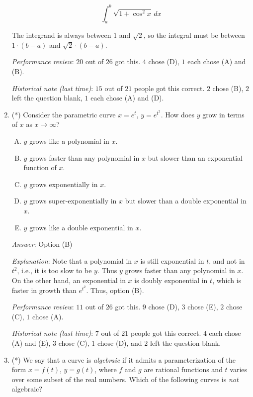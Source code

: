 \documentclass[10pt]{amsart}
\begin{document}
\begin{enumerate}
  $$\int_a^b \sqrt{1 + \cos^2x} \, dx$$

  The integrand is always between $1$ and $\sqrt{2}$, so the integral
  must be between $1 \cdot (b - a)$ and $\sqrt{2} \cdot (b - a)$.

  {\em Performance review}: $20$ out of $26$ got this. $4$ chose (D),
  $1$ each chose (A) and (B).

  {\em Historical note (last time)}: $15$ out of $21$ people got this
  correct. $2$ chose (B), $2$ left the question blank, $1$ each chose
  (A) and (D).

\item (*) Consider the parametric curve $x = e^t$, $y = e^{t^2}$. How does
  $y$ grow in terms of $x$ as $x \to \infty$?

  \begin{enumerate}[(A)]
  \item $y$ grows like a polynomial in $x$.
  \item $y$ grows faster than any polynomial in $x$ but slower than an
    exponential function of $x$.
  \item $y$ grows exponentially in $x$.
  \item $y$ grows super-exponentially in $x$ but slower than a double
    exponential in $x$.
  \item $y$ grows like a double exponential in $x$.
  \end{enumerate}

  {\em Answer}: Option (B)

  {\em Explanation}: Note that a polynomial in $x$ is still
  exponential in $t$, and not in $t^2$, i.e., it is too slow to be
  $y$. Thus $y$ grows faster than any polynomial in $x$. On the other
  hand, an exponential in $x$ is doubly exponential in $t$, which is
  faster in growth than $e^{t^2}$. Thus, option (B).

  {\em Performance review}: $11$ out of $26$ got this. $9$ chose (D),
  $3$ chose (E), $2$ chose (C), $1$ chose (A).

  {\em Historical note (last time)}: $7$ out of $21$
  people got this correct. $4$ each chose (A) and (E), $3$ chose (C),
  $1$ chose (D), and $2$ left the question blank.

\item (*) We say that a curve is {\em algebraic} if it admits a
  parameterization of the form $x = f(t)$, $y = g(t)$, where $f$ and
  $g$ are rational functions and $t$ varies over some subset of the real
  numbers. Which of the following curves is {\em not} algebraic?


\end{enumerate}
\end{document}
